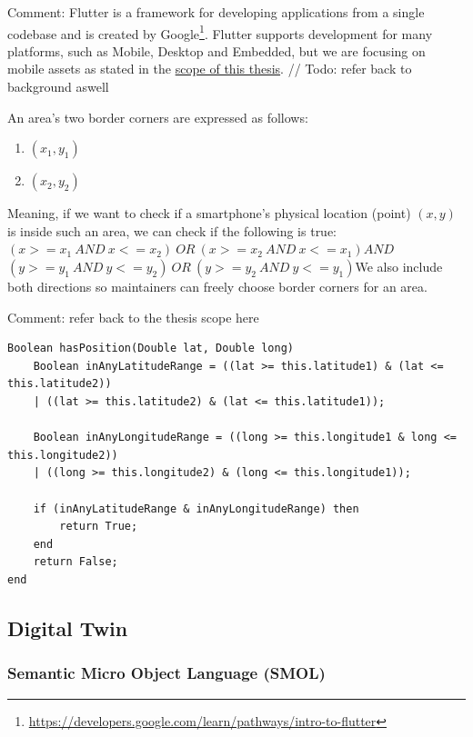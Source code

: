 \documentclass{article}
\begin{document}
Comment: Flutter is a framework for developing applications from a single codebase and is created by Google\footnote{\url{https://developers.google.com/learn/pathways/intro-to-flutter}}. Flutter supports development for many platforms, such as Mobile, Desktop and Embedded, but we are focusing on mobile assets as stated in the \hyperref[subsec:Scope]{scope of this thesis}.
// Todo: refer back to background aswell



An area's two border corners are expressed as follows:
\begin{enumerate}
    \item $(x_1, y_1)$
    \item $(x_2, y_2)$
\end{enumerate}
Meaning, if we want to check if a smartphone's physical location (point) $(x, y)$ is inside such an area, we can check if the following is true:\newline\newline$(x >= x_1\:AND\: x <= x_2)\:OR\:(x >= x_2\:AND\:x <= x_1)$\newline$AND$\newline$(y >= y_1\:AND\:y <= y_2)\:OR\:(y >= y_2\:AND\:y <= y_1)$\newline We also include both directions so maintainers can freely choose border corners for an area. 

Comment: refer back to the thesis scope here
\begin{verbatim}
Boolean hasPosition(Double lat, Double long)
    Boolean inAnyLatitudeRange = ((lat >= this.latitude1) & (lat <= this.latitude2)) 
    | ((lat >= this.latitude2) & (lat <= this.latitude1));
    
    Boolean inAnyLongitudeRange = ((long >= this.longitude1 & long <= this.longitude2)) 
    | ((long >= this.longitude2) & (long <= this.longitude1));

    if (inAnyLatitudeRange & inAnyLongitudeRange) then
        return True;
    end
    return False;
end
\end{verbatim}



\subsection{Digital Twin}
\subsubsection{Semantic Micro Object Language (SMOL)}
\end{document}
